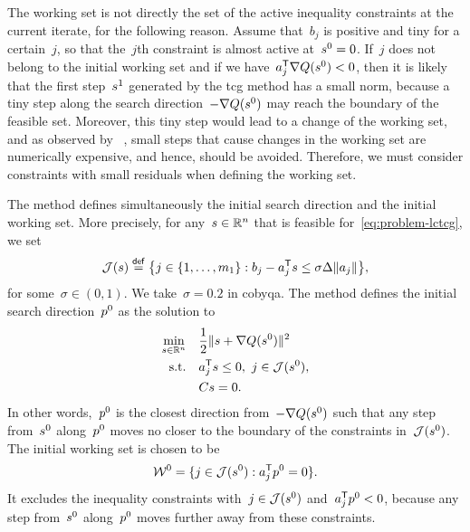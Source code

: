 The working set is not directly the set of the active inequality constraints at the current iterate, for the following reason.
Assume that~$b_j$ is positive and tiny for a certain~$j$, so that the~$j$th constraint is almost active at~$\sstep[0] = 0$.
If~$j$ does not belong to the initial working set and if we have~$a_j^{\T} \nabla Q(\sstep[0]) < 0$, then it is likely that the first step~$\sstep[1]$ generated by the \gls{tcg} method has a small norm, because a tiny step along the search direction~$-\nabla Q(\sstep[0])$ may reach the boundary of the feasible set.
Moreover, this tiny step would lead to a change of the working set, and as observed by \citeauthor{Powell_2015}~\cite[\S~3]{Powell_2015}, small steps that cause changes in the working set are numerically
expensive, and hence, should be avoided.
Therefore, we must consider constraints with small residuals when defining the working set.

The method defines simultaneously the initial search direction and the initial working set.
More precisely, for any~$\sstep \in \R^n$ that is feasible for~\cref{eq:problem-lctcg}, we set
\begin{equation*}
    \mathcal{J}(\sstep) \eqdef \set[\big]{j \in \set{1, \dots, m_1} : b_j - a_j^{\T} \sstep \le \sigma \rad \norm{a_j}},
\end{equation*}
for some~$\sigma \in (0, 1)$.
We take~$\sigma = 0.2$ in \gls{cobyqa}.
The method defines the initial search direction~$\pstep[0]$ as the solution to
\begin{subequations}
    \label{eq:tcg-linear-working-set}
    \begin{align}
        \min_{\sstep \in \R^n}  & \quad \frac{1}{2} \norm{\sstep + \nabla Q(\sstep[0])}^2\\
        \text{s.t.}             & \quad a_j^{\T} \sstep \le 0, ~ j \in \mathcal{J}(\sstep[0]),\\
                                & \quad C \sstep = 0.
    \end{align}
\end{subequations}
In other words,~$\pstep[0]$ is the closest direction from~$-\nabla Q(\sstep[0])$ such that any step from~$\sstep[0]$ along~$\pstep[0]$ moves no closer to the boundary of the constraints in~$\mathcal{J}(\sstep[0])$.
The initial working set is chosen to be
\begin{equation}
    \label{eq:tcg-linear-working-set-initial}
    \mathcal{W}^0 = \set{j \in \mathcal{J}(\sstep[0]) : a_j^{\T} \pstep[0] = 0}.
\end{equation}
It excludes the inequality constraints with~$j \in \mathcal{J}(\sstep[0])$ and~$a_j^{\T} \pstep[0] < 0$, because any step from~$\sstep[0]$ along~$\pstep[0]$ moves further away from these constraints.

